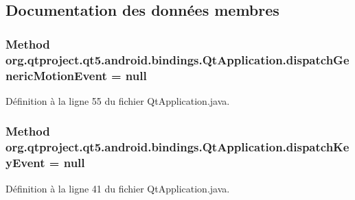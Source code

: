 \subsection{Documentation des données membres}
\hypertarget{classorg_1_1qtproject_1_1qt5_1_1android_1_1bindings_1_1_qt_application_a2c2d0ff311ded8aaa6dabdde99632a6c}{
\subsubsection[{dispatch\-Generic\-Motion\-Event}]{\setlength{\rightskip}{0pt plus 5cm}Method org.\-qtproject.\-qt5.\-android.\-bindings.\-Qt\-Application.\-dispatch\-Generic\-Motion\-Event = null\hspace{0.3cm}{\ttfamily [static]}}}\label{classorg_1_1qtproject_1_1qt5_1_1android_1_1bindings_1_1_qt_application_a2c2d0ff311ded8aaa6dabdde99632a6c}


Définition à la ligne 55 du fichier Qt\-Application.\-java.

\hypertarget{classorg_1_1qtproject_1_1qt5_1_1android_1_1bindings_1_1_qt_application_a970719713bf7310b041b31dd6415fdcb}{
\subsubsection[{dispatch\-Key\-Event}]{\setlength{\rightskip}{0pt plus 5cm}Method org.\-qtproject.\-qt5.\-android.\-bindings.\-Qt\-Application.\-dispatch\-Key\-Event = null\hspace{0.3cm}{\ttfamily [static]}}}\label{classorg_1_1qtproject_1_1qt5_1_1android_1_1bindings_1_1_qt_application_a970719713bf7310b041b31dd6415fdcb}


Définition à la ligne 41 du fichier Qt\-Application.\-java.


